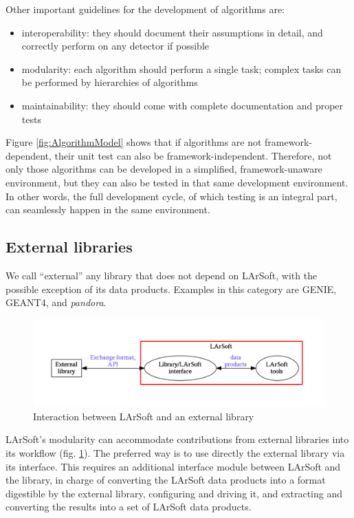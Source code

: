 \documentclass{article}
\begin{document}
Other important guidelines for the development of algorithms are:

\begin{itemize}
\item
  interoperability: they should document their assumptions in detail,
  and correctly perform on any detector if possible
\item
  modularity: each algorithm should perform a single task; complex tasks
  can be performed by hierarchies of algorithms
\item
  maintainability: they should come with complete documentation and
  proper tests
\end{itemize}

Figure \ref{fig:AlgorithmModel} shows that if algorithms are not
framework-dependent, their unit test can also be framework-independent.
Therefore, not only those algorithms can be developed in a simplified,
framework-unaware environment, but they can also be tested in that same
development environment. In other words, the full development cycle, of
which testing is an integral part, can seamlessly happen in the same
environment.

\subsection{External libraries}\label{external-libraries}

We call ``external'' any library that does not depend on LArSoft, with
the possible exception of its data products. Examples in this category
are GENIE, GEANT4, and \emph{pandora}.

\begin{figure}[htbp]
\centering
\includegraphics[width=\textwidth]{figures/LArSoftAndExternals.pdf}
\caption{\label{fig:LArSoftAndExternals}Interaction between LArSoft and
an external library}
\end{figure}

LArSoft's modularity can accommodate contributions from external
libraries into its workflow (fig. \ref{fig:LArSoftAndExternals}). The
preferred way is to use directly the external library via its interface.
This requires an additional interface module between LArSoft and the
library, in charge of converting the LArSoft data products into a format
digestible by the external library, configuring and driving it, and
extracting and converting the results into a set of LArSoft data
products.
\end{document}
